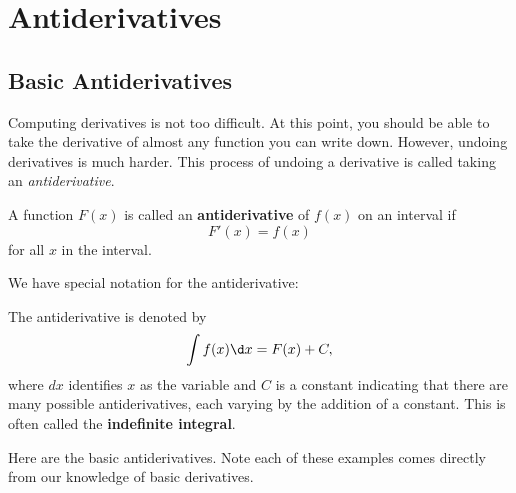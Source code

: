 \chapter{Antiderivatives}

\section{Basic Antiderivatives}

Computing derivatives is not too difficult. At this point, you should
be able to take the derivative of almost any function you can write
down. However, undoing derivatives is much harder. This process of
undoing a derivative is called taking an \textit{antiderivative}.

\begin{definition}
A function $F(x)$ is called an \textbf{antiderivative} of $f(x)$ on an
interval if
\[
F'(x) = f(x)
\]
for all $x$ in the interval.
\end{definition}

We have special notation for the antiderivative:

\begin{definition}
The antiderivative is denoted by
\[
\int f(x) \d x = F(x)+C,
\]
where $dx$ identifies $x$ as the variable and $C$ is a constant
indicating that there are many possible antiderivatives, each varying by
the addition of a constant.  This is often called the
\textbf{indefinite integral}.
\end{definition}

Here are the basic antiderivatives. Note each of these examples comes
directly from our knowledge of basic derivatives.


